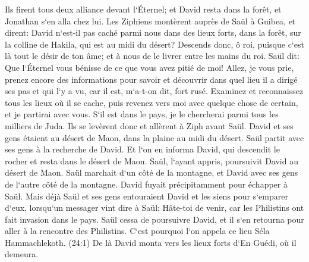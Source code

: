 \verse Ils firent tous deux alliance devant l`Éternel; et David resta dans la forêt, et Jonathan s`en alla chez lui. 
\verse Les Ziphiens montèrent auprès de Saül à Guibea, et dirent: David n`est-il pas caché parmi nous dans des lieux forts, dans la forêt, sur la colline de Hakila, qui est au midi du désert? 
\verse Descends donc, ô roi, puisque c`est là tout le désir de ton âme; et à nous de le livrer entre les mains du roi. 
\verse Saül dit: Que l`Éternel vous bénisse de ce que vous avez pitié de moi! 
\verse Allez, je vous prie, prenez encore des informations pour savoir et découvrir dans quel lieu il a dirigé ses pas et qui l`y a vu, car il est, m`a-t-on dit, fort rusé. 
\verse Examinez et reconnaissez tous les lieux où il se cache, puis revenez vers moi avec quelque chose de certain, et je partirai avec vous. S`il est dans le pays, je le chercherai parmi tous les milliers de Juda. 
\verse Ils se levèrent donc et allèrent à Ziph avant Saül. David et ses gens étaient au désert de Maon, dans la plaine au midi du désert. 
\verse Saül partit avec ses gens à la recherche de David. Et l`on en informa David, qui descendit le rocher et resta dans le désert de Maon. Saül, l`ayant appris, poursuivit David au désert de Maon. 
\verse Saül marchait d`un côté de la montagne, et David avec ses gens de l`autre côté de la montagne. David fuyait précipitamment pour échapper à Saül. Mais déjà Saül et ses gens entouraient David et les siens pour s`emparer d`eux, 
\verse lorsqu`un messager vint dire à Saül: Hâte-toi de venir, car les Philistins ont fait invasion dans le pays. 
\verse Saül cessa de poursuivre David, et il s`en retourna pour aller à la rencontre des Philistins. C`est pourquoi l`on appela ce lieu Séla Hammachlekoth. 
\verse (24:1) De là David monta vers les lieux forts d`En Guédi, où il demeura. 

\chapter{}

